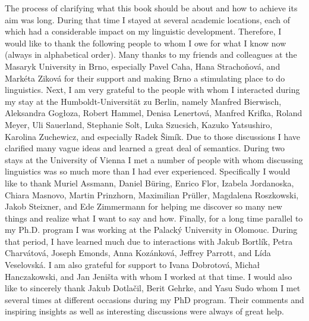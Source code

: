 The process of clarifying what this book should be about and how to achieve its aim was long. During that time I stayed at several academic locations, each of which had a considerable impact on my linguistic development. Therefore, I would like to thank the following people to whom I owe for what I know now (always in alphabetical order). Many thanks to my friends and colleagues at the Masaryk University in Brno, especially Pavel Caha, Hana Strachoňová, and Markéta Ziková for their support and making Brno a stimulating place to do linguistics. Next, I am very grateful to the people with whom I interacted during my stay at the Humboldt-Universität zu Berlin, namely Manfred Bierwisch, Aleksandra Gogłoza, Robert Hammel, Denisa Lenertová, Manfred Krifka, Roland Meyer, Uli Sauerland, Stephanie Solt, Luka Szucsich, Kazuko Yatsushiro, Karolina Zuchewicz, and especially Radek Šimík. Due to those discussions I have clarified many vague ideas and learned a great deal of semantics. During two stays at the University of Vienna I met a number of people with whom discussing linguistics was so much more than I had ever experienced. Specifically I would like to thank Muriel Assmann, Daniel Büring, Enrico Flor, Izabela Jordanoska, Chiara Masnovo, Martin Prinzhorn, Maximilian Prüller, Magdalena Roszkowski, Jakob Steixner, and Ede Zimmermann for helping me discover so many new things and realize what I want to say and how. Finally, for a long time parallel to my Ph.D. program I was working at the Palacký University in Olomouc. During that period, I have learned much due to interactions with Jakub Bortlík, Petra Charvátová, Joseph Emonds, Anna Kozánková, Jeffrey Parrott, and Lída Veselovská. I am also grateful for support to Ivana Dobrotová, Michał Hanczakowski, and Jan Jeništa with whom I worked at that time. I would also like to sincerely thank Jakub Dotlačil, Berit Gehrke, and Yasu Sudo whom I met several times at different occasions during my PhD program. Their comments and inspiring insights as well as interesting discussions were always of great help. 

